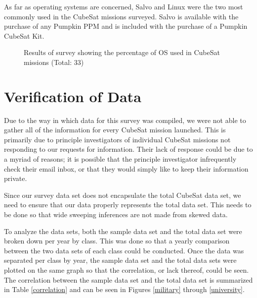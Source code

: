 \documentclass[11pt]{article}
\begin{document}
As far as operating systems are concerned, Salvo and Linux were the two most commonly used in the CubeSat missions surveyed.  Salvo is available with the purchase of any Pumpkin PPM and is included with the purchase of a Pumpkin CubeSat Kit.

\begin{figure}[ht!]
\centering
{}
\caption{Results of survey showing the percentage of OS used in CubeSat missions (Total: 33)}
\label{OS}
\end{figure}

\section{Verification of Data}
Due to the way in which data for this survey was compiled, we were not able to gather all of the information for every CubeSat mission launched. This is primarily due to principle investigators of individual CubeSat missions not responding to our requests for information.  Their lack of response could be due to a myriad of reasons; it is possible that the principle investigator infrequently check their email inbox, or that they would simply like to keep their information private. 

Since our survey data set does not encapsulate the total CubeSat data set, we need to ensure that our data properly represents the total data set. This needs to be done so that wide sweeping inferences are not made from skewed data. 

To analyze the data sets, both the sample data set and the total data set were broken down per year by class. This was done so that a yearly comparison between the two data sets of each class could be conducted. Once the data was separated per class by year, the sample data set and the total data sets were plotted on the same graph so that the correlation, or lack thereof, could be seen. The correlation between the sample data set and the total data set is summarized in Table \ref{correlation} and can be seen in Figures \ref{military} through \ref{university}. 
\end{document}
